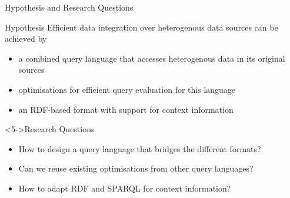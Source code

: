 







\begin{frame}{Hypothesis and Research Questions}

  \begin{block}{Hypothesis}%
    Efficient data integration over heterogenous data sources can be achieved by
    \begin{itemize}
    \item<2-> a combined query language that accesses heterogenous data in its original sources
    \item<3-> optimisations for efficient query evaluation for this language
    \item<4-> an RDF-based format with support for context information
    \end{itemize}
  \end{block}


  \begin{block}<5->{Research Questions}%
    \begin{itemize}
    \item<5-> How to design a query language that bridges the different formats?
    \item<6-> Can we reuse existing optimisations from other query languages?
    \item<7-> How to adapt RDF and SPARQL for context information?
    \end{itemize}
  \end{block}


\end{frame}





